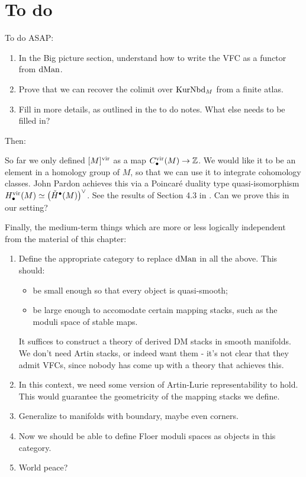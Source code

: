 \section{To do}
To do ASAP:
\begin{enumerate}
\item In the Big picture section, understand how to write the VFC as a functor from $\operatorname{dMan}$.
\item Prove that we can recover the colimit over $\operatorname{KurNbd}_M$ from a finite atlas.
\item Fill in more details, as outlined in the to do notes. What else needs to be filled in?
\end{enumerate}

Then:

\begin{rem}
\label{rem:poincare}
So far we only defined $[M]^{\operatorname{vir}}$ as a map $C^{\operatorname{vir}}_{\bullet}(M)\to \mathbb Z$. We would like it to be an element in a
homology group of $M$, so that we can use it to integrate cohomology classes. John Pardon achieves this via
a Poincar\'e duality type quasi-isomorphism $H^{\operatorname{vir}}_{\bullet}(M) \simeq \big(\check{H}^{\bullet}(M)\big)^{\vee}$.
See the results of Section 4.3 in \cite{Pardon_An_algebraic_approach_2016}.
Can we prove this in our setting?
\end{rem}

Finally, the medium-term things which are more or less logically independent from the material of this chapter:
\begin{enumerate}
\item Define the appropriate category to replace $\operatorname{dMan}$ in all the above. This should:
\begin{itemize}
\item be small enough so that every object is quasi-smooth;
\item be large enough to accomodate certain mapping stacks, such as the moduli space of stable maps.
\end{itemize}
It suffices to construct a theory of derived DM stacks in smooth manifolds. We don't need Artin stacks, or indeed want them
- it's not clear that they admit VFCs, since nobody has come up with a theory that achieves this.
\item In this context, we need some version of Artin-Lurie representability to hold. This would guarantee the geometricity of
the mapping stacks we define.
\item Generalize to manifolds with boundary, maybe even corners.
\item Now we should be able to define Floer moduli spaces as objects in this category.
\item World peace?
\end{enumerate}
